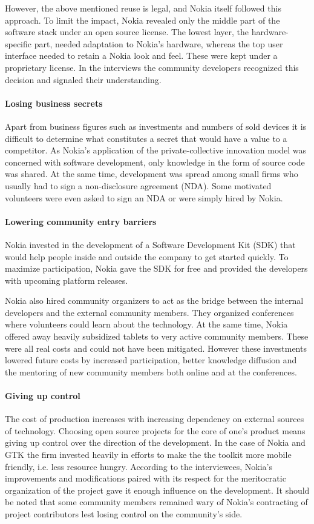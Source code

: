 \documentclass[a4paper]{scrartcl}
\begin{document}
However, the above mentioned reuse is legal, and Nokia itself followed this approach.
To limit the impact, Nokia revealed only the middle part of the software stack under an open source license.
The lowest layer, the hardware-specific part, needed adaptation to Nokia's hardware, whereas the top user interface needed to retain a Nokia look and feel. 
These were kept under a proprietary license.
In the interviews the community developers recognized this decision and signaled their understanding.

\paragraph{Losing business secrets}
Apart from business figures such as investments and numbers of sold devices it is difficult to determine what constitutes a secret that would have a value to a competitor.
As Nokia's application of the private-collective innovation model was concerned with software development, only knowledge in the form of source code was shared.
At the same time, development was spread among small firms who usually had to sign a non-disclosure agreement (NDA).
Some motivated volunteers were even asked to sign an NDA or were simply hired by Nokia.

\paragraph{Lowering community entry barriers}
Nokia invested in the development of a Software Development Kit (SDK) that would help people inside and outside the company to get started quickly. 
To maximize participation, Nokia gave the SDK for free and provided the developers with upcoming platform releases.

Nokia also hired community organizers to act as the bridge between the internal developers and the external community members. 
They organized conferences where volunteers could learn about the technology.
At the same time, Nokia offered away heavily subsidized tablets to very active community members.
These were all real costs and could not have been mitigated. 
However these investments lowered future costs by increased participation, better knowledge diffusion and the mentoring of new community members both online and at the conferences.

\paragraph{Giving up control}
The cost of production increases with increasing dependency on external sources of technology.
Choosing open source projects for the core of one's product means giving up control over the direction of the development.
In the case of Nokia and GTK the firm invested heavily in efforts to make the the toolkit more mobile friendly, i.e. less resource hungry.
According to the interviewees, Nokia's improvements and modifications paired with its respect for the meritocratic organization of the project gave it enough influence on the development.
It should be noted that some community members remained wary of Nokia's contracting of  project contributors lest losing control on the community's side.
\end{document}
